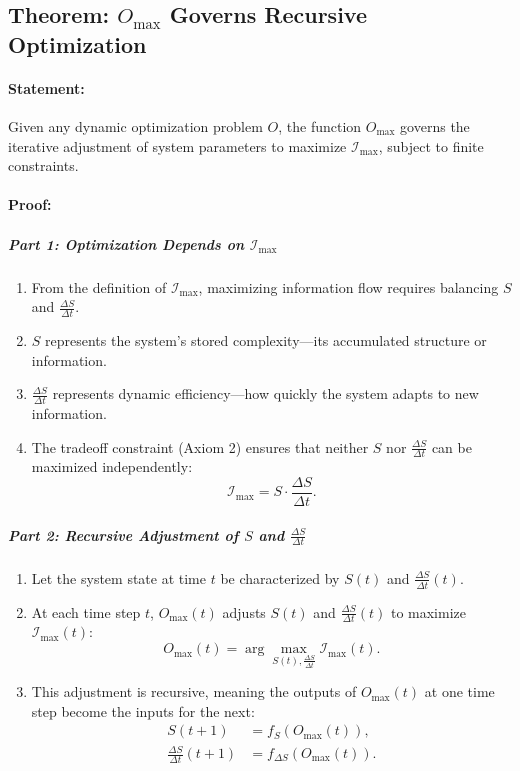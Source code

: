 \documentclass[12pt]{article}
\begin{document}
\subsection{Theorem: \(O_{\text{max}}\) Governs Recursive Optimization}

\paragraph{Statement:}
Given any dynamic optimization problem \(O\), the function \(O_{\text{max}}\) governs the iterative adjustment of system parameters to maximize \(\mathcal{I}_{\text{max}}\), subject to finite constraints.

\paragraph{Proof:}

\subparagraph{Part 1: Optimization Depends on \(\mathcal{I}_{\text{max}}\)}
\begin{enumerate}
    \item From the definition of \(\mathcal{I}_{\text{max}}\), maximizing information flow requires balancing \(S\) and \(\frac{\Delta S}{\Delta t}\).
    \item \(S\) represents the system's stored complexity—its accumulated structure or information.
    \item \(\frac{\Delta S}{\Delta t}\) represents dynamic efficiency—how quickly the system adapts to new information.
    \item The tradeoff constraint (Axiom 2) ensures that neither \(S\) nor \(\frac{\Delta S}{\Delta t}\) can be maximized independently:
    \[
    \mathcal{I}_{\text{max}} = S \cdot \frac{\Delta S}{\Delta t}.
    \]
\end{enumerate}

\subparagraph{Part 2: Recursive Adjustment of \(S\) and \(\frac{\Delta S}{\Delta t}\)}
\begin{enumerate}
    \item Let the system state at time \(t\) be characterized by \(S(t)\) and \(\frac{\Delta S}{\Delta t}(t)\).
    \item At each time step \(t\), \(O_{\text{max}}(t)\) adjusts \(S(t)\) and \(\frac{\Delta S}{\Delta t}(t)\) to maximize \(\mathcal{I}_{\text{max}}(t)\):
    \[
    O_{\text{max}}(t) = \arg \max_{S(t), \frac{\Delta S}{\Delta t}} \mathcal{I}_{\text{max}}(t).
    \]
    \item This adjustment is recursive, meaning the outputs of \(O_{\text{max}}(t)\) at one time step become the inputs for the next:
    \[
    \begin{aligned}
    S(t+1) &= f_S(O_{\text{max}}(t)), \\
    \frac{\Delta S}{\Delta t}(t+1) &= f_{\Delta S}(O_{\text{max}}(t)).
    \end{aligned}
    \]
\end{enumerate}
\end{document}
